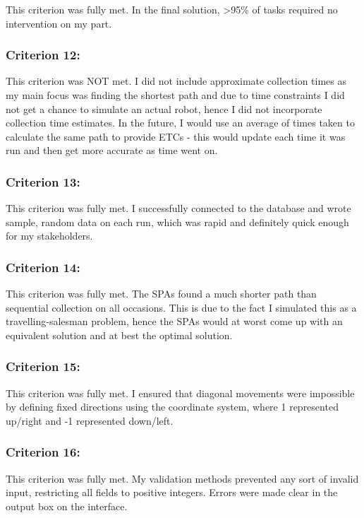 This criterion was fully met. In the final solution, >95\% of tasks required no intervention on my part.

\subsubsection{Criterion 12:}

This criterion was NOT met. I did not include approximate collection times as my main focus was finding the shortest path and due to time constraints I did not get a chance to simulate an actual robot, hence I did not incorporate collection time estimates. In the future, I would use an average of times taken to calculate the same path to provide ETCs - this would update each time it was run and then get more accurate as time went on.

\subsubsection{Criterion 13:}

This criterion was fully met. I successfully connected to the database and wrote sample, random data on each run, which was rapid and definitely quick enough for my stakeholders.

\subsubsection{Criterion 14:}

This criterion was fully met. The SPAs found a much shorter path than sequential collection on all occasions. This is due to the fact I simulated this as a travelling-salesman problem, hence the SPAs would at worst come up with an equivalent solution and at best the optimal solution.


\subsubsection{Criterion 15:}
This criterion was fully met. I ensured that diagonal movements were impossible by defining fixed directions using the coordinate system, where 1 represented up/right and -1 represented down/left.

\subsubsection{Criterion 16:}

This criterion was fully met. My validation methods prevented any sort of invalid input, restricting all fields to positive integers. Errors were made clear in the output box on the interface.

